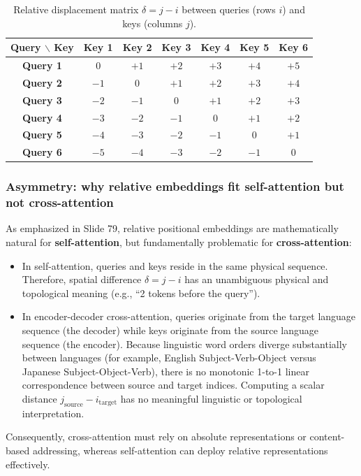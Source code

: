 \documentclass[../../../main.tex]{subfiles}
\begin{document}
\begin{table}[htbp]
\centering
\small
\caption{Relative displacement matrix $\delta = j - i$ between queries (rows $i$) and keys (columns $j$).}
\label{tab:relative_offsets_grid}
\begin{tabular}{c c c c c c c}
\toprule
\textbf{Query $\backslash$ Key} & \textbf{Key 1} & \textbf{Key 2} & \textbf{Key 3} & \textbf{Key 4} & \textbf{Key 5} & \textbf{Key 6} \\
\midrule
\textbf{Query 1} & $0$ & $+1$ & $+2$ & $+3$ & $+4$ & $+5$ \\
\textbf{Query 2} & $-1$ & $0$ & $+1$ & $+2$ & $+3$ & $+4$ \\
\textbf{Query 3} & $-2$ & $-1$ & $0$ & $+1$ & $+2$ & $+3$ \\
\textbf{Query 4} & $-3$ & $-2$ & $-1$ & $0$ & $+1$ & $+2$ \\
\textbf{Query 5} & $-4$ & $-3$ & $-2$ & $-1$ & $0$ & $+1$ \\
\textbf{Query 6} & $-5$ & $-4$ & $-3$ & $-2$ & $-1$ & $0$ \\
\bottomrule
\end{tabular}
\end{table}

\subsubsection{Asymmetry: why relative embeddings fit self-attention but not cross-attention}
As emphasized in Slide 79, relative positional embeddings are mathematically natural for \textbf{self-attention}, but fundamentally problematic for \textbf{cross-attention}:
\begin{itemize}
    \item In self-attention, queries and keys reside in the same physical sequence. Therefore, spatial difference $\delta = j - i$ has an unambiguous physical and topological meaning (e.g., ``2 tokens before the query'').
    \item In encoder-decoder cross-attention, queries originate from the target language sequence (the decoder) while keys originate from the source language sequence (the encoder). Because linguistic word orders diverge substantially between languages (for example, English Subject-Verb-Object versus Japanese Subject-Object-Verb), there is no monotonic 1-to-1 linear correspondence between source and target indices. Computing a scalar distance $j_{\text{source}} - i_{\text{target}}$ has no meaningful linguistic or topological interpretation.
\end{itemize}
Consequently, cross-attention must rely on absolute representations or content-based addressing, whereas self-attention can deploy relative representations effectively.
\end{document}
